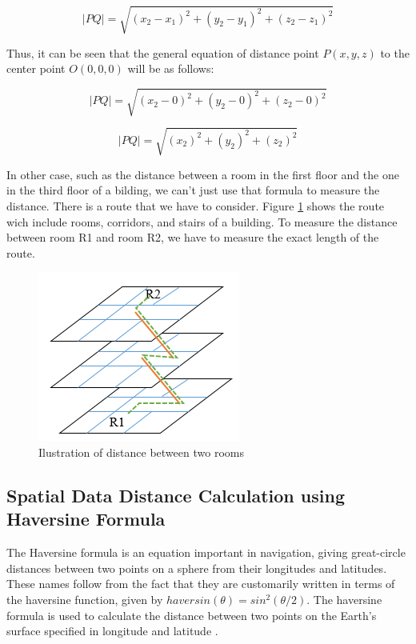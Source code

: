 \begin{equation}\label{distance-between-2-points}
|PQ|= \sqrt{(x_2 - x_1)^2 + (y_2 - y_1)^2 + (z_2 - z_1)^2}
\end{equation}

Thus, it can be seen that the general equation of distance point $P (x, y, z)$ to the center point $O (0,0,0)$ will be as follows:

\begin{equation}\label{A-star-heuristic}
|PQ|= \sqrt{(x_2 - 0)^2 + (y_2 - 0)^2 + (z_2 - 0)^2}
\end{equation}

\begin{equation}\label{A-star-heuristic}
|PQ|= \sqrt{(x_2)^2 + (y_2)^2 + (z_2)^2}
\end{equation}

In other case, such as the distance between a room in the first floor and the one in the third floor of a bilding, we can’t just use that formula to measure the distance. There is a route that we have to consider. Figure \ref{fig:figure12} shows the route wich include rooms, corridors, and stairs of a building. To measure the distance between room R1 and room R2, we have to measure the exact length of the route.

\begin{figure}[h!]
	\centering
	\includegraphics[scale=1]{figure12.png}
	\caption{Ilustration of distance between two rooms}
	\label{fig:figure12}
\end{figure}
\subsection{Spatial Data Distance Calculation using Haversine Formula}
The Haversine formula is an equation important in navigation, giving great-circle distances between two points on a sphere from their longitudes and latitudes. These names follow from the fact that they are customarily written in terms of the haversine function, given by $haversin (\theta) = sin^2
(\theta/2)$. The haversine formula is used to calculate the distance between two points on the Earth’s surface specified in longitude and latitude \cite{chopde2013landmark}.

